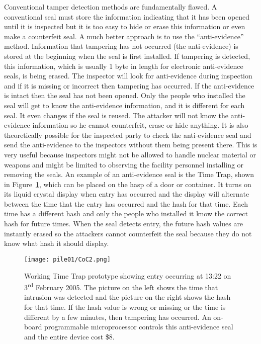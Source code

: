\documentclass[twoside,titlepage,11pt,twocolumn,a4paper]{article}
\begin{document}
Conventional tamper detection methods are fundamentally flawed. A
conventional seal must store the information indicating that it has
been opened until it is inspected but it is too easy to hide or erase
this information or even make a counterfeit seal. A much better
approach is to use the ``anti-evidence'' method. Information that
tampering has not occurred (the anti-evidence) is stored at the
beginning when the seal is first
installed. \citep{nuclearSafeguardsAndSec2005} If tampering is
detected, this information, which is usually 1 byte in length for
electronic anti-evidence seals, is being erased.
\citep{unconventionalCoC2010} The inspector will look for
anti-evidence during inspection and if it is missing or incorrect then
tampering has occurred. If the anti-evidence is intact then the seal
has not been opened. Only the people who installed the seal will get
to know the anti-evidence information, and it is different for each
seal. It even changes if the seal is reused. The attacker will not
know the anti-evidence information so he cannot counterfeit, erase or
hide anything. \citep{nuclearSafeguardsAndSec2005} It is also
theoretically possible for the inspected party to check the
anti-evidence seal and send the anti-evidence to the inspectors
without them being present there. \citep{unconventionalCoC2010} This
is very useful because inspectors might not be allowed to handle
nuclear material or weapons and might be limited to observing the
facility personnel installing or removing the seals. An example of an
anti-evidence seal is the Time Trap, shown in Figure~\ref{fig:CoC2},
which can be placed on the hasp of a door or container. It turns on
its liquid crystal display when entry has occurred and the display
will alternate between the time that the entry has occurred and the
hash for that time. Each time has a different hash and only the people
who installed it know the correct hash for future times. When the seal
detects entry, the future hash values are instantly erased so the
attackers cannot counterfeit the seal because they do not know what
hash it should display. \citep{nuclearSafeguardsAndSec2005}

\begin{figure}
  \texttt{[image: pile01/CoC2.png]}
  \caption{Working Time Trap prototype showing entry occurring at
    13:22 on 3\textsuperscript{rd} February 2005. The picture on the
    left shows the time that intrusion was detected and the picture on
    the right shows the hash for that time. If the hash value is wrong
    or missing or the time is different by a few minutes, then
    tampering has occurred. An on-board programmable microprocessor
    controls this anti-evidence seal and the entire device cost
    \$8. \citep{nuclearSafeguardsAndSec2005}}
  \label{fig:CoC2}
\end{figure}
\end{document}
